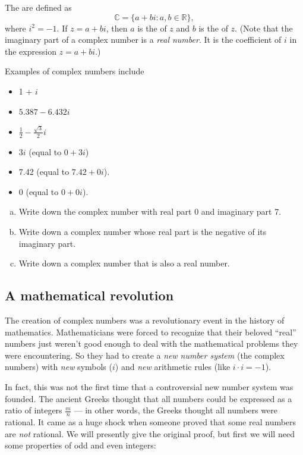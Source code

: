 \begin{defn}
The  are defined
as 
\[
{\mathbb{C}}=\{a+bi:a,b\in{\mathbb{R}}\},\]
 where $i^{2}=-1$. If $z=a+bi$, then $a$ is the  of $z$ and $b$ is the  of $z$. (Note that the imaginary part of a complex number is a \emph{real number}. It is the coefficient of $i$ in the expression $z = a + bi$.)
\end{defn}

\bigskip

 Examples of complex numbers include 
\begin{itemize}
\item 1 + $i$ 
\item $5.387-6.432i$ 
\item $\frac{1}{2}-\frac{\sqrt{3}}{2}i$ 
\item $3i$ (equal to $0+3i$) 
\item 7.42 (equal to $7.42+0i$).
\item 0 (equal to $0+0i$).
\end{itemize}
\begin{exercise}{1}
\begin{enumerate}[(a)]
\item
Write down the complex number with real part 0 and imaginary part 7.
\item
Write down a complex number whose real part is the negative of its imaginary part.
\item
Write down a complex number that is also a real number.
\end{enumerate}
\end{exercise}

\subsection{A mathematical revolution}

The creation of complex numbers was a revolutionary event in
the history of mathematics. Mathematicians were forced to recognize
that their beloved ``real'' numbers just weren't good enough to
deal with the mathematical problems they were encountering. So they
had to create a \emph{new} \emph{number system} (the complex numbers)
with\emph{ new}  symbols ($i$) and \emph{new} arithmetic rules
(like $i\cdot i=-1$).

In fact, this was not the first time that a controversial new number
system was founded. The ancient Greeks thought that all numbers could
be expressed as a ratio of integers $\frac{m}{n}$ --- in other words, the Greeks thought all numbers were rational.  It came as a huge
shock when someone proved that some real numbers are \emph{not} rational. We will presently give the original proof, but first we will need some properties of odd and even integers:

